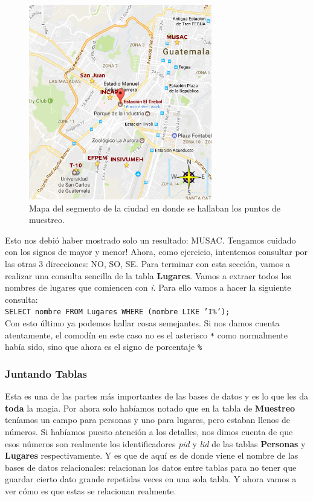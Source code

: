 \documentclass[10pt,letterpaper]{article}
\newcommand{\inlinecode}[1]{
\colorbox{light-gray}{\texttt{#1}}
}
\begin{document}
\begin{figure}[H]
\begin{center}
\caption{Mapa del segmento de la ciudad en donde se hallaban los puntos de muestreo.}
\includegraphics[width=8cm]{img/mapa_monair.png}
\end{center}
\end{figure}

Esto nos debi\'o haber mostrado solo un resultado: MUSAC. Tengamos cuidado con los signos de mayor y menor! Ahora, como ejercicio, intentemos consultar por las otras 3 direcciones: NO, SO, SE. Para terminar con esta secci\'on, vamos a realizar una consulta sencilla de la tabla \textbf{Lugares}. Vamos a extraer todos los nombres de lugares que comiencen con \emph{i}. Para ello vamos a hacer la siguiente consulta:\\ \inlinecode{SELECT nombre FROM Lugares WHERE (nombre LIKE 'I\%');}\\

Con esto \'ultimo ya podemos hallar cosas semejantes. Si nos damos cuenta atentamente, el comod\'in en este caso no es el asterisco \inlinecode{*} como normalmente hab\'ia sido, sino que ahora es el signo de porcentaje \inlinecode{\%}

\subsubsection{Juntando Tablas}
Esta es una de las partes m\'as importantes de las bases de datos y es lo que les da \textbf{toda} la magia. Por ahora solo hab\'iamos notado que en la tabla de \textbf{Muestreo} ten\'iamos un campo para personas y uno para lugares, pero estaban llenos de n\'umeros. Si hab\'iamos puesto atenci\'on a los detalles, nos dimos cuenta de que esos n\'umeros son realmente los identificadores \emph{pid} y \emph{lid} de las tablas \textbf{Personas} y \textbf{Lugares} respectivamente. Y es que de aqu\'i es de donde viene el nombre de las bases de datos relacionales: relacionan los datos entre tablas para no tener que guardar cierto dato grande repetidas veces en una sola tabla. Y ahora vamos a ver c\'omo es que estas se relacionan realmente.\\
\end{document}
